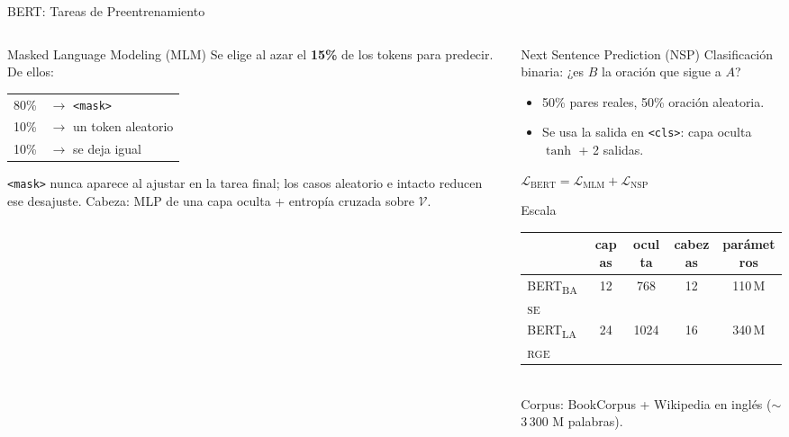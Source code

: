 \documentclass[aspectratio=169, 10pt]{beamer}
\newcommand{\V}{\mathcal{V}}
\newcommand{\tok}[1]{\texttt{#1}}
\newcommand{\formula}[1]{%
	\begin{tcolorbox}[colback=UCMBlue!8, colframe=UCMBlue, arc=4pt,
		boxsep=2pt, left=6pt, right=6pt, top=3pt, bottom=3pt]
		#1
	\end{tcolorbox}
}
\begin{document}
\begin{frame}[shrink]{BERT: Tareas de Preentrenamiento}

	\begin{columns}[T]
		\begin{column}{0.5\textwidth}
			\begin{block}{Masked Language Modeling (MLM)}
				\small
				Se elige al azar el \textbf{15\%} de los tokens para predecir. De ellos:
				\begin{center}
					\begin{tabular}{@{}cl@{}}
						\toprule
						80\% & $\to$ \tok{<mask>} \\
						10\% & $\to$ un token aleatorio \\
						10\% & $\to$ se deja igual \\
						\bottomrule
					\end{tabular}
				\end{center}
				\tok{<mask>} nunca aparece al ajustar en la tarea final; los casos aleatorio e intacto reducen ese desajuste. Cabeza: MLP de una capa oculta + entrop\'ia cruzada sobre $\V$.
			\end{block}
		\end{column}

		\begin{column}{0.47\textwidth}
			\begin{block}{Next Sentence Prediction (NSP)}
				\small
				Clasificaci\'on binaria: ¿es $B$ la oraci\'on que sigue a $A$?
				\begin{itemize}
					\item 50\% pares reales, 50\% oraci\'on aleatoria.
					\item Se usa la salida en \tok{<cls>}: capa oculta $\tanh$ + 2 salidas.
				\end{itemize}
			\end{block}

			\formula{\centering $\mathcal{L}_{\text{BERT}} = \mathcal{L}_{\text{MLM}} + \mathcal{L}_{\text{NSP}}$}

			\begin{block}{Escala}
				\scriptsize
				\setlength{\tabcolsep}{3pt}
				\begin{tabular}{@{}lcccc@{}}
					\toprule
					& capas & oculta & cabezas & par\'ametros \\
					\midrule
					BERT\textsubscript{BASE} & 12 & 768 & 12 & 110\,M \\
					BERT\textsubscript{LARGE} & 24 & 1024 & 16 & 340\,M \\
					\bottomrule
				\end{tabular}
				\\[2pt]
				Corpus: BookCorpus + Wikipedia en ingl\'es ($\sim$3\,300 M palabras).
			\end{block}
		\end{column}
	\end{columns}

\end{frame}
\end{document}
